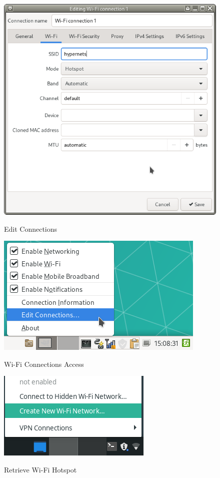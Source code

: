 \begin{figure}[H]
	\centering
	\begin{minipage}[l]{0.49\linewidth}
		\centering
		\includegraphics[width=\linewidth]{images/wifi2.png}
		\caption{Edit Connections}
		\label{fig:editConnection}
	\end{minipage}
	\begin{minipage}[r]{0.49\linewidth}
		\centering
		\includegraphics[width=.8\linewidth]{images/wifi1.png}
		\caption{Wi-Fi Connections Access}
		\label{fig:wifiConfig}
		\vspace{\baselineskip}
		\includegraphics[width=.7\linewidth]{images/wifi3.png}
		\caption{Retrieve Wi-Fi Hotspot} \par
		\label{fig:retrieveWifi}
	\end{minipage}
\end{figure}


